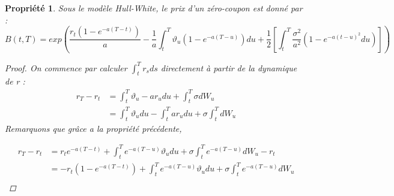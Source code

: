 \documentclass[11pt]{article}
\newtheorem{property}[theorem]{Propriété}
\let\vega\vartheta
\begin{document}
\begin{property} Sous le modèle Hull-White, le prix d'un zéro-coupon est donné par :
\begin{displaymath}
	B(t,T)=exp(\frac{ r_t (1-e^{-a(T-t)})}{a} - \frac{1}{a}\int_t^T \vega_u (1-e^{-a(T-u)}) du + \frac{1}{2}[\int_t^T \frac{{\sigma}^2}{a^2}(1-e^{-a(t-u)^2} du)])
\end{displaymath}

 
    \begin{proof}
    	On commence par calculer $\int_t^T r_s ds$ directement à partir de la dynamique de r :
        \begin{align*}
        	r_T - r_t & = \int_t^T \vega_u - a r_u du + \int_t^T\sigma d W_u \\
            		& = \int_t^T \vega_u du - \int_t^T ar_u du + \sigma\int_t^T dW_u
        \end{align*}
       	Remarquons que grâce a la propriété précédente, 
        
        \begin{align*}
        r_T - r_t & = r_{t}e^{-a(T-t)}+\int_t^T e^{-a(T-u)}\vega_u du + \sigma \int_t^T e^{-a(T-u)}dW_u - r_t \\
        & = -r_{t}(1-e^{-a(T-t)})+\int_t^T e^{-a(T-u)}\vega_u du + \sigma \int_t^T e^{-a(T-u)}dW_u \\
        \end{align*}
        

\end{proof}
\end{property}
\end{document}
